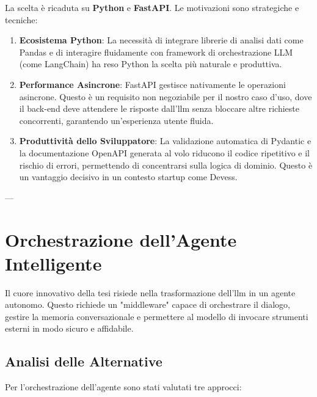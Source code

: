 La scelta è ricaduta su \textbf{Python} e \textbf{FastAPI}. Le motivazioni sono strategiche e tecniche:
\begin{enumerate}
    \item \textbf{Ecosistema Python}: La necessità di integrare librerie di analisi dati come Pandas e di interagire fluidamente con framework di orchestrazione LLM (come LangChain) ha reso Python la scelta più naturale e produttiva.
    \item \textbf{Performance Asincrone}: FastAPI gestisce nativamente le operazioni asincrone. Questo è un requisito non negoziabile per il nostro caso d'uso, dove il back-end deve attendere le risposte dall'\gls{llm} senza bloccare altre richieste concorrenti, garantendo un'esperienza utente fluida.
    \item \textbf{Produttività dello Sviluppatore}: La validazione automatica di Pydantic e la documentazione OpenAPI generata al volo riducono il codice ripetitivo e il rischio di errori, permettendo di concentrarsi sulla logica di dominio. Questo è un vantaggio decisivo in un contesto startup come Devess.
\end{enumerate}

---

\section{Orchestrazione dell'Agente Intelligente}
\label{sec:agent_orchestration}

Il cuore innovativo della tesi risiede nella trasformazione dell'\gls{llm} in un agente autonomo. Questo richiede un "middleware" capace di orchestrare il dialogo, gestire la memoria conversazionale e permettere al modello di invocare strumenti esterni in modo sicuro e affidabile.

\subsection{Analisi delle Alternative}

Per l'orchestrazione dell'agente sono stati valutati tre approcci:


